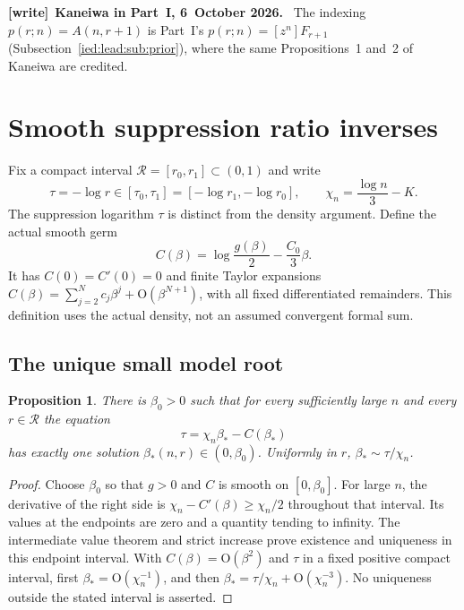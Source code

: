 \documentclass[11pt,letterpaper]{article}
\newtheorem{proposition}[theorem]{Proposition}
\theoremstyle{remark}\newtheorem{remark}[theorem]{Remark}
\newcommand{\Oh}{\mathrm O}\newcommand{\supp}{\operatorname{supp}}
\newenvironment{writenote}[1][]{\par\smallskip\begingroup\small
 \noindent\textbf{[write]}\if\relax\detokenize{#1}\relax\else~\textbf{#1.}\fi\ }%
 {\par\endgroup\smallskip}
\begin{document}
\begin{writenote}[Kaneiwa in Part~I, 6~October 2026]
The indexing $p(r;n)=A(n,r+1)$ is Part~I's $p(r;n)=[z^n]F_{r+1}$ (Subsection~\ref{ied:lead:sub:prior}), where the same Propositions~1 and~2 of Kaneiwa are credited.
\end{writenote}

\section{Smooth suppression ratio inverses}\label{ied:log:sec:inverse}
Fix a compact interval $\mathcal R=[r_0,r_1]\subset(0,1)$ and write
\begin{equation}\label{ied:log:eq:inversevariables}
 \tau=-\log r\in[\tau_0,\tau_1]=[-\log r_1,-\log r_0],
 \qquad \chi_n=\frac{\log n}{3}-K.
\end{equation}
The suppression logarithm $\tau$ is distinct from the density argument.
Define the actual smooth germ
\begin{equation}\label{ied:log:eq:Cgerm}
 C(\beta)=\log\frac{g(\beta)}2-\frac{C_0}{3}\beta.
\end{equation}
It has $C(0)=C'(0)=0$ and finite Taylor expansions
$C(\beta)=\sum_{j=2}^Nc_j\beta^j+\Oh(\beta^{N+1})$, with all fixed differentiated remainders. This definition uses the actual density, not an assumed convergent formal sum.

\subsection{The unique small model root}
\begin{proposition}\label{ied:log:prop:inverseroot}
There is $\beta_0>0$ such that for every sufficiently large $n$ and every $r\in\mathcal R$ the equation
\begin{equation}\label{ied:log:eq:modelequation}
 \tau=\chi_n\beta_*-C(\beta_*)
\end{equation}
has exactly one solution $\beta_*(n,r)\in(0,\beta_0)$. Uniformly in $r$,
$\beta_*\sim\tau/\chi_n$.
\end{proposition}
\begin{proof}
Choose $\beta_0$ so that $g>0$ and $C$ is smooth on $[0,\beta_0]$.
For large $n$, the derivative of the right side is
$\chi_n-C'(\beta)\ge \chi_n/2$ throughout that interval. Its values at the endpoints are zero and a quantity tending to infinity. The intermediate value theorem and strict increase prove existence and uniqueness in this endpoint interval. With $C(\beta)=\Oh(\beta^2)$ and $\tau$ in a fixed positive compact interval, first $\beta_*=\Oh(\chi_n^{-1})$, and then
$\beta_* =\tau/\chi_n+\Oh(\chi_n^{-3})$. No uniqueness outside the stated interval is asserted.
\end{proof}
\end{document}
